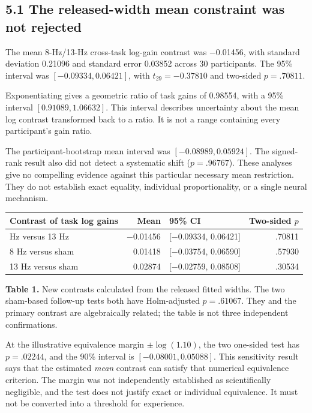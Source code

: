 \documentclass[
  11pt,
]{article}
\let\ctdoldsubsection\subsection
\renewcommand{\subsection}{\Needspace{6\baselineskip}\ctdoldsubsection}
\begin{document}
\hypertarget{the-released-width-mean-constraint-was-not-rejected}{%
\subsection{5.1 The released-width mean constraint was not
rejected}\label{the-released-width-mean-constraint-was-not-rejected}}

The mean 8-Hz/13-Hz cross-task log-gain contrast was −0.01456, with
standard deviation 0.21096 and standard error 0.03852 across 30
participants. The 95\% interval was \([-0.09334,0.06421]\), with
\(t_{29}=-0.37810\) and two-sided \(p=.70811\).

Exponentiating gives a geometric ratio of task gains of 0.98554, with a
95\% interval \([0.91089,1.06632]\). This interval describes uncertainty
about the mean log contrast transformed back to a ratio. It is not a
range containing every participant's gain ratio.

The participant-bootstrap mean interval was \([-0.08989,0.05924]\). The
signed-rank result also did not detect a systematic shift
(\(p=.96767\)). These analyses give no compelling evidence against this
particular necessary mean restriction. They do not establish exact
equality, individual proportionality, or a single neural mechanism.


\begin{longtable}[]{@{}lrlr@{}}
\toprule\noalign{}
Contrast of task log gains & Mean & 95\% CI & Two-sided \(p\) \\
\midrule\noalign{}
\endhead
\bottomrule\noalign{}
\endlastfoot
8 Hz versus 13 Hz & −0.01456 & {[}−0.09334, 0.06421{]} & .70811 \\
8 Hz versus sham & 0.01418 & {[}−0.03754, 0.06590{]} & .57930 \\
13 Hz versus sham & 0.02874 & {[}−0.02759, 0.08508{]} & .30534 \\
\end{longtable}

\textbf{Table 1.} New contrasts calculated from the released fitted
widths. The two sham-based follow-up tests both have Holm-adjusted
\(p=.61067\). They and the primary contrast are algebraically related;
the table is not three independent confirmations.

At the illustrative equivalence margin \(\pm\log(1.10)\), the two
one-sided test has \(p=.02244\), and the 90\% interval is
\([-0.08001,0.05088]\). This sensitivity result says that the estimated
\emph{mean} contrast can satisfy that numerical equivalence criterion.
The margin was not independently established as scientifically
negligible, and the test does not justify exact or individual
equivalence. It must not be converted into a threshold for experience.
\end{document}

